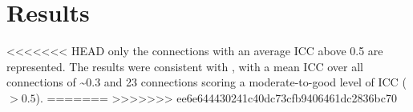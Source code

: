 \documentclass[authoryear]{elsarticle}
\begin{document}
%


\section{Results}

<<<<<<< HEAD
only the connections with an average ICC above 0.5 are represented. The results were consistent with \citep{Shehzad2009}, with a mean ICC over all connections of \textasciitilde0.3 and 23 connections scoring a moderate-to-good level of ICC ($>0.5$).
=======
>>>>>>> ee6e644430241c40dc73cfb9406461dc2836bc70
\end{document}
